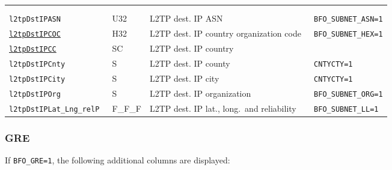\documentclass[documentation]{subfiles}
\begin{document}
\begin{longtable}{>{\tt}lll>{\tt\small}l}
    \\
    \multicolumn{4}{l}{If {\tt BFO\_SUBNET\_TEST\_L2TP=1}, the following columns are displayed:}\\
    \\

    l2tpDstIPASN                    & U32        & L2TP dest. IP ASN                           & BFO\_SUBNET\_ASN=1\\
    \hyperref[subnet]{l2tpDstIPCOC} & H32        & L2TP dest. IP country organization code     & BFO\_SUBNET\_HEX=1\\
    \hyperref[subnet]{l2tpDstIPCC}  & SC         & L2TP dest. IP country                       & \\
    l2tpDstIPCnty                   & S          & L2TP dest. IP county                        & CNTYCTY=1\\
    l2tpDstIPCity                   & S          & L2TP dest. IP city                          & CNTYCTY=1\\
    l2tpDstIPOrg                    & S          & L2TP dest. IP organization                  & BFO\_SUBNET\_ORG=1\\
    l2tpDstIPLat\_Lng\_relP         & F\_F\_F    & L2TP dest. IP lat., long.\ and reliability  & BFO\_SUBNET\_LL=1\\
    \bottomrule
\end{longtable}

\subsubsection{GRE}\label{s:bfo:gre}

If {\tt BFO\_GRE=1}, the following additional columns are displayed:
\end{document}
